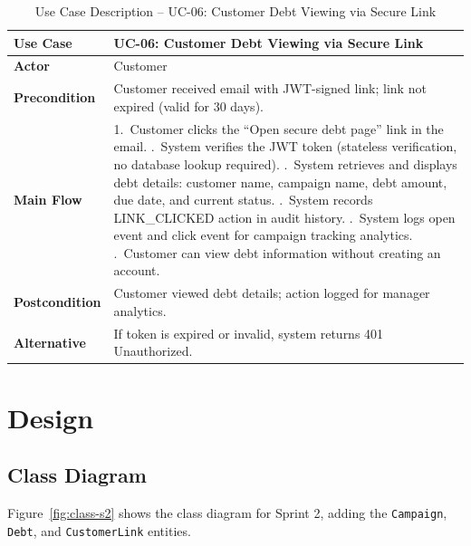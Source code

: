 \documentclass[12pt,a4paper]{report}
\begin{document}
\begin{table}[H]
  \centering
  \renewcommand{\arraystretch}{1.3}
  \begin{tabular}{|>{\bfseries}p{3.5cm}|p{10cm}|}
    \hline
    Use Case      & UC-06: Customer Debt Viewing via Secure Link \\
    \hline
    Actor         & Customer \\
    \hline
    Precondition  & Customer received email with JWT-signed link; link not expired (valid for 30 days). \\
    \hline
    Main Flow     & 1.\ Customer clicks the ``Open secure debt page'' link in the email. \newline
                    2.\ System verifies the JWT token (stateless verification, no database lookup required). \newline
                    3.\ System retrieves and displays debt details: customer name, campaign name, debt amount, due date, and current status. \newline
                    4.\ System records LINK\_CLICKED action in audit history. \newline
                    5.\ System logs open event and click event for campaign tracking analytics. \newline
                    6.\ Customer can view debt information without creating an account. \\
    \hline
    Postcondition & Customer viewed debt details; action logged for manager analytics. \\
    \hline
    Alternative   & If token is expired or invalid, system returns 401 Unauthorized. \\
    \hline
  \end{tabular}
  \caption{Use Case Description -- UC-06: Customer Debt Viewing via Secure Link}
  \label{tab:uc06}
\end{table}

\section{Design}

\subsection{Class Diagram}

Figure~\ref{fig:class-s2} shows the class diagram for Sprint 2, adding the
\texttt{Campaign}, \texttt{Debt}, and \texttt{CustomerLink} entities.
\end{document}
